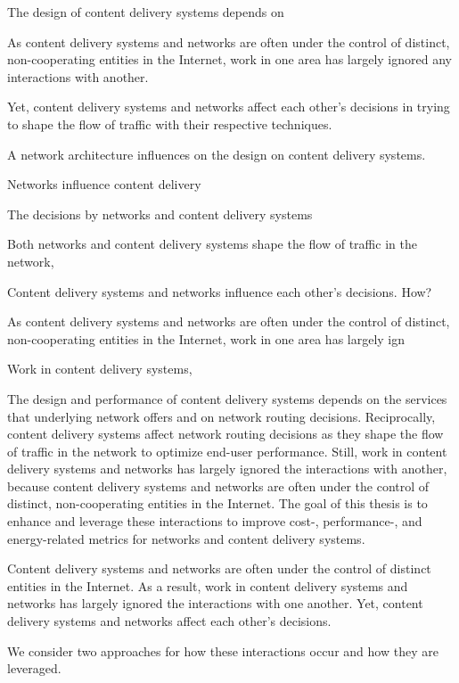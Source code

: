 The design of content delivery systems depends on 



As content delivery systems and networks are often under the control of distinct, non-cooperating entities in the Internet, work in one area has largely ignored any interactions with another.

Yet, content delivery systems and networks affect each other's decisions in trying to shape the flow of traffic with their respective techniques. 




A network architecture influences on the design on content delivery systems. 


Networks influence content delivery 

The decisions by networks and content delivery systems 

Both networks and content delivery systems shape the flow of traffic in the network, 

Content delivery systems and networks influence each other's decisions. How?

As content delivery systems and networks are often under the control of distinct, non-cooperating entities in the Internet, work in one area has largely ign


Work in content delivery systems, 



The design and performance of content delivery systems depends on the services that underlying network offers and on network routing decisions.
Reciprocally, content delivery systems affect network routing decisions as they shape the flow of traffic in the network to optimize end-user performance. 
Still, work in content delivery systems and networks has largely ignored the interactions with another, because content delivery systems and networks are often under the control of distinct, non-cooperating entities in the Internet.
The goal of this thesis is to enhance and leverage these interactions to improve cost-, performance-, and energy-related metrics for networks and content delivery systems.


Content delivery systems and networks are often under the control of distinct entities in the Internet. 
As a result, work in content delivery systems and networks has largely ignored the interactions with one another. 
Yet, content delivery systems and networks affect each other's decisions.


 

We consider two approaches for how these interactions occur and how they are leveraged. 

